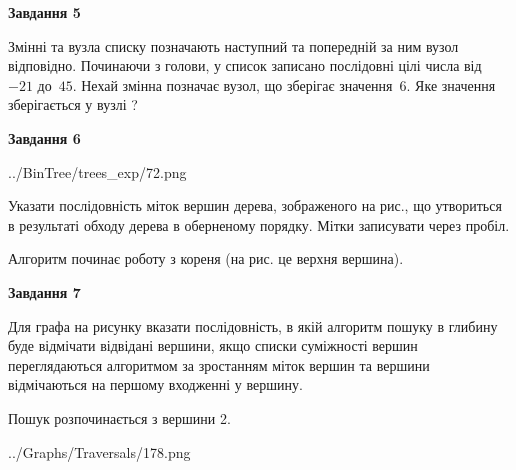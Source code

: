 \documentclass[12pt, ukrainian]{article}
\begin{document}
{\begin {large}
{\begin {center}\textbf{Завдання 5}\end {center}}\par
Змінні  та  вузла списку позначають наступний та попередній за ним вузол відповідно. Починаючи з голови, у список записано послідовні цілі числа від~$-21$ до~$45$. Нехай змінна  позначає вузол, що зберігає значення~$6$.
Яке значення зберігається у вузлі  ?\par
\newpage

{\begin {center}\textbf{Завдання 6}\end {center}}\par

\begin{center}
	{../BinTree/trees_exp/72.png}
\end{center}
Указати послідовність міток вершин дерева, зображеного на рис., що утвориться в результаті обходу дерева в оберненому порядку. Мітки записувати через пробіл.\par Алгоритм починає роботу з кореня (на рис. це верхня вершина).\par
\newpage

{\begin {center}\textbf{Завдання 7}\end {center}}\par
Для графа на рисунку вказати послідовність, в якій алгоритм пошуку в глибину буде відмічати відвідані вершини, якщо списки суміжності вершин переглядаються алгоритмом за зростанням міток вершин та вершини відмічаються на першому вход\-женні у вершину.\par
Пошук розпочинається з вершини 2.\par

\begin{center}
	{../Graphs/Traversals/178.png}
\end{center}\par
\newpage


\end{large}}
\end{document}
